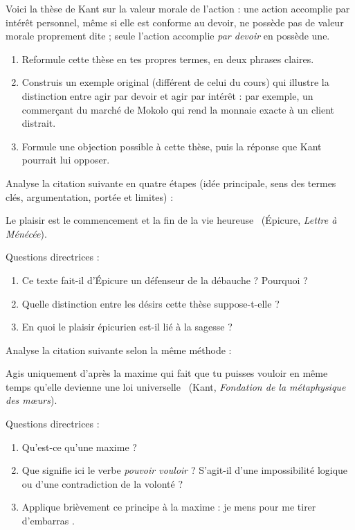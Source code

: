 \documentclass[11pt]{article}
\newcommand{\cle}[1]{{\popxbold\color{popdark}#1}}
\newcounter{popsec}
\newcounter{popsub}
\newcommand{\courssub}[1]{%
  \stepcounter{popsub}%
  \par\vspace{9pt}\noindent{\popxbold\fontsize{11.5}{13}\selectfont\color{popink}{\color{poporange}\thepopsec.\thepopsub}\hspace{6pt}#1}\par\nopagebreak\vspace{4pt}
}
\begin{document}
\courssub{Je m'entraîne}

\begin{exercice}
Voici la thèse de Kant sur la valeur morale de l'action : une action accomplie par intérêt personnel, même si elle est conforme au devoir, ne possède pas de valeur morale proprement dite ; seule l'action accomplie \emph{par devoir} en possède une.

\begin{enumerate}
\item Reformule cette thèse en tes propres termes, en deux phrases claires.
\item Construis un exemple original (différent de celui du cours) qui illustre la distinction entre agir par devoir et agir par intérêt : par exemple, un commerçant du marché de Mokolo qui rend la monnaie exacte à un client distrait.
\item Formule une objection possible à cette thèse, puis la réponse que Kant pourrait lui opposer.
\end{enumerate}
\end{exercice}

\begin{exercice}
Analyse la citation suivante en quatre étapes (idée principale, sens des termes clés, argumentation, portée et limites) :

\guillemotleft Le plaisir est le commencement et la fin de la vie heureuse \guillemotright\ (Épicure, \emph{Lettre à Ménécée}).

Questions directrices :
\begin{enumerate}
\item Ce texte fait-il d'Épicure un défenseur de la débauche ? Pourquoi ?
\item Quelle distinction entre les désirs cette thèse suppose-t-elle ?
\item En quoi le plaisir épicurien est-il lié à la \cle{sagesse} ?
\end{enumerate}
\end{exercice}

\begin{exercice}
Analyse la citation suivante selon la même méthode :

\guillemotleft Agis uniquement d'après la maxime qui fait que tu puisses vouloir en même temps qu'elle devienne une loi universelle \guillemotright\ (Kant, \emph{Fondation de la métaphysique des mœurs}).

Questions directrices :
\begin{enumerate}
\item Qu'est-ce qu'une \cle{maxime} ?
\item Que signifie ici le verbe \emph{pouvoir vouloir} ? S'agit-il d'une impossibilité logique ou d'une contradiction de la volonté ?
\item Applique brièvement ce principe à la maxime : \guillemotleft je mens pour me tirer d'embarras \guillemotright.
\end{enumerate}
\end{exercice}
\end{document}
